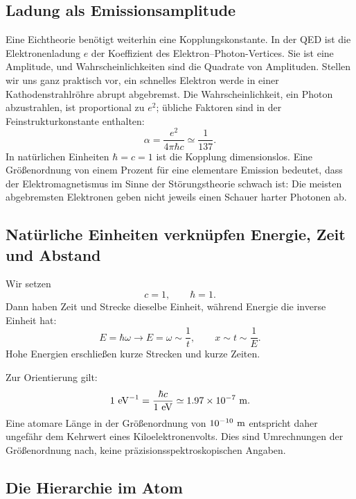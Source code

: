 \subsection{Ladung als Emissionsamplitude}

Eine Eichtheorie benötigt weiterhin eine Kopplungskonstante. In der QED ist die Elektronenladung \(e\) der Koeffizient des Elektron--Photon-Vertices. Sie ist eine Amplitude, und Wahrscheinlichkeiten sind die Quadrate von Amplituden. Stellen wir uns ganz praktisch vor, ein schnelles Elektron werde in einer Kathodenstrahlröhre abrupt abgebremst. Die Wahrscheinlichkeit, ein Photon abzustrahlen, ist proportional zu \(e^2\); übliche Faktoren sind in der Feinstrukturkonstante enthalten:
\begin{equation}
\alpha=\frac{e^2}{4\pi\hbar c}
\simeq \frac{1}{137}.
\label{eq:l5-alpha}
\end{equation}
In natürlichen Einheiten \(\hbar=c=1\) ist die Kopplung dimensionslos. Eine Größenordnung von einem Prozent für eine elementare Emission bedeutet, dass der Elektromagnetismus im Sinne der Störungstheorie schwach ist: Die meisten abgebremsten Elektronen geben nicht jeweils einen Schauer harter Photonen ab.

\subsection{Natürliche Einheiten verknüpfen Energie, Zeit und Abstand}

Wir setzen
\begin{equation}
c=1,
\qquad
\hbar=1.
\end{equation}
Dann haben Zeit und Strecke dieselbe Einheit, während Energie die inverse Einheit hat:
\begin{equation}
E=\hbar\omega\longrightarrow E=\omega\sim\frac1t,
\qquad
x\sim t\sim\frac1E.
\end{equation}
Hohe Energien erschließen kurze Strecken und kurze Zeiten.

Zur Orientierung gilt:
\begin{equation}
1\ {\rm eV}^{-1}
=\frac{\hbar c}{1\ {\rm eV}}
\simeq 1.97\times10^{-7}\ {\rm m}.
\end{equation}
Eine atomare Länge in der Größenordnung von \(10^{-10}\ {\rm m}\) entspricht daher ungefähr dem Kehrwert eines Kiloelektronenvolts. Dies sind Umrechnungen der Größenordnung nach, keine präzisionsspektroskopischen Angaben.

\subsection{Die Hierarchie im Atom}

